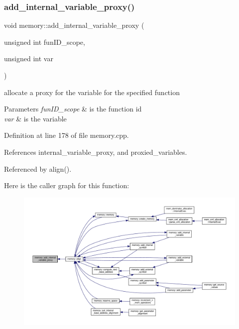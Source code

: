\subsubsection{\texorpdfstring{add\+\_\+internal\+\_\+variable\+\_\+proxy()}{add\_internal\_variable\_proxy()}}
{\footnotesize\ttfamily void memory\+::add\+\_\+internal\+\_\+variable\+\_\+proxy (\begin{DoxyParamCaption}\item[{unsigned int}]{fun\+I\+D\+\_\+scope,  }\item[{unsigned int}]{var }\end{DoxyParamCaption})}



allocate a proxy for the variable for the specified function 


\begin{DoxyParams}{Parameters}
{\em fun\+I\+D\+\_\+scope} & is the function id \\
\hline
{\em var} & is the variable \\
\hline
\end{DoxyParams}


Definition at line 178 of file memory.\+cpp.



References internal\+\_\+variable\+\_\+proxy, and proxied\+\_\+variables.



Referenced by align().

Here is the caller graph for this function\+:
\nopagebreak
\begin{figure}[H]
\begin{center}
\leavevmode
\includegraphics[width=350pt]{d8/d99/classmemory_af1e653b61323d7728656dadf8249a369_icgraph}
\end{center}
\end{figure}
\mbox{\label{classmemory_a8ed6105d60330239af187ab2d414d019}} 
